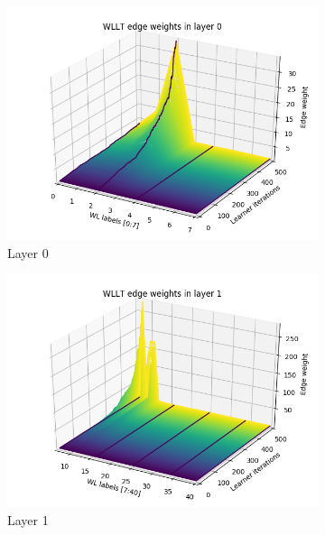 		\begin{figure}[H]
			\centering
			\begin{subfigure}{0.3\textwidth}
				\centering
				\includegraphics[width=1.\linewidth]{images/plotA3_WLLT_ewL0_MUTAG_d5_e500}
				\caption{Layer 0}
				\label{fig:fig:plota3wlltewl0mutagd5e500}
			\end{subfigure}		
			\begin{subfigure}{0.3\textwidth}
				\centering
				\includegraphics[width=1.\linewidth]{images/plotA3_WLLT_ewL1_MUTAG_d5_e500}
				\caption{Layer 1}
				\label{fig:fig:plota3wlltewl1mutagd5e500}
			\end{subfigure}
			\begin{subfigure}{0.3\textwidth}

\end{subfigure}
\end{figure}
